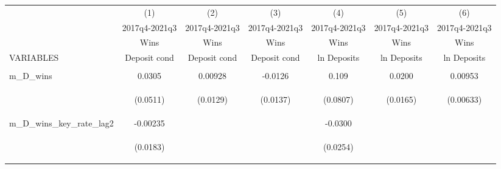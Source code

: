 \documentclass[]{article}
\begin{document}
\begin{center}
\begin{tabular}{lcccccc} \hline
 & (1) & (2) & (3) & (4) & (5) & (6) \\
 & 2017q4-2021q3 & 2017q4-2021q3 & 2017q4-2021q3 & 2017q4-2021q3 & 2017q4-2021q3 & 2017q4-2021q3 \\
 & Wins & Wins & Wins & Wins & Wins & Wins \\
VARIABLES & Deposit cond & Deposit cond & Deposit cond & ln Deposits & ln Deposits & ln Deposits \\ \hline
\vspace{4pt} & \begin{footnotesize}\end{footnotesize} & \begin{footnotesize}\end{footnotesize} & \begin{footnotesize}\end{footnotesize} & \begin{footnotesize}\end{footnotesize} & \begin{footnotesize}\end{footnotesize} & \begin{footnotesize}\end{footnotesize} \\
m\_D\_wins & 0.0305 & 0.00928 & -0.0126 & 0.109 & 0.0200 & 0.00953 \\
\vspace{4pt} & \begin{footnotesize}(0.0511)\end{footnotesize} & \begin{footnotesize}(0.0129)\end{footnotesize} & \begin{footnotesize}(0.0137)\end{footnotesize} & \begin{footnotesize}(0.0807)\end{footnotesize} & \begin{footnotesize}(0.0165)\end{footnotesize} & \begin{footnotesize}(0.00633)\end{footnotesize} \\
m\_D\_wins\_key\_rate\_lag2 & -0.00235 &  &  & -0.0300 &  &  \\
\vspace{4pt} & \begin{footnotesize}(0.0183)\end{footnotesize} & \begin{footnotesize}\end{footnotesize} & \begin{footnotesize}\end{footnotesize} & \begin{footnotesize}(0.0254)\end{footnotesize} & \begin{footnotesize}\end{footnotesize} & \begin{footnotesize}\end{footnotesize} \\

\end{tabular}
\end{center}
\end{document}
